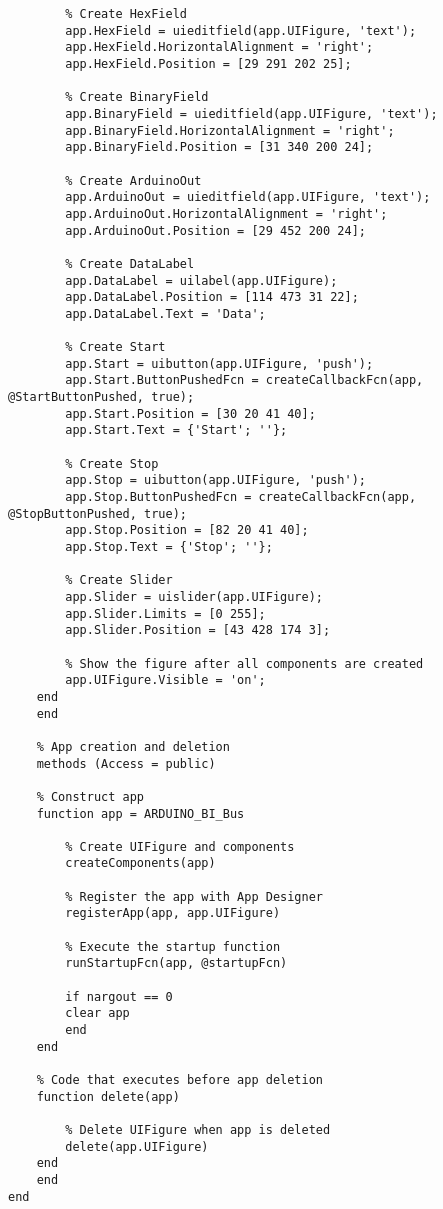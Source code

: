 \documentclass[11pt]{article}
\begin{document}
\begin{verbatim}
	    % Create HexField
	    app.HexField = uieditfield(app.UIFigure, 'text');
	    app.HexField.HorizontalAlignment = 'right';
	    app.HexField.Position = [29 291 202 25];

	    % Create BinaryField
	    app.BinaryField = uieditfield(app.UIFigure, 'text');
	    app.BinaryField.HorizontalAlignment = 'right';
	    app.BinaryField.Position = [31 340 200 24];

	    % Create ArduinoOut
	    app.ArduinoOut = uieditfield(app.UIFigure, 'text');
	    app.ArduinoOut.HorizontalAlignment = 'right';
	    app.ArduinoOut.Position = [29 452 200 24];

	    % Create DataLabel
	    app.DataLabel = uilabel(app.UIFigure);
	    app.DataLabel.Position = [114 473 31 22];
	    app.DataLabel.Text = 'Data';

	    % Create Start
	    app.Start = uibutton(app.UIFigure, 'push');
	    app.Start.ButtonPushedFcn = createCallbackFcn(app, @StartButtonPushed, true);
	    app.Start.Position = [30 20 41 40];
	    app.Start.Text = {'Start'; ''};

	    % Create Stop
	    app.Stop = uibutton(app.UIFigure, 'push');
	    app.Stop.ButtonPushedFcn = createCallbackFcn(app, @StopButtonPushed, true);
	    app.Stop.Position = [82 20 41 40];
	    app.Stop.Text = {'Stop'; ''};

	    % Create Slider
	    app.Slider = uislider(app.UIFigure);
	    app.Slider.Limits = [0 255];
	    app.Slider.Position = [43 428 174 3];

	    % Show the figure after all components are created
	    app.UIFigure.Visible = 'on';
	end
    end

    % App creation and deletion
    methods (Access = public)

	% Construct app
	function app = ARDUINO_BI_Bus

	    % Create UIFigure and components
	    createComponents(app)

	    % Register the app with App Designer
	    registerApp(app, app.UIFigure)

	    % Execute the startup function
	    runStartupFcn(app, @startupFcn)

	    if nargout == 0
		clear app
	    end
	end

	% Code that executes before app deletion
	function delete(app)

	    % Delete UIFigure when app is deleted
	    delete(app.UIFigure)
	end
    end
end
\end{verbatim}
\end{document}
